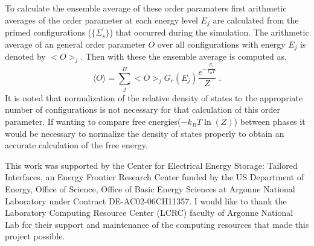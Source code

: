 \documentclass[aps,prl,reprint,superscriptaddress,showkeys]{revtex4-1}
\begin{document}
To calculate the ensemble average of these order paramaters first arithmetic averages of the order parameter at each energy level $E_j$ are calculated from the primed configurations ($\{\Sigma_s ^{'}\}$) that occurred during the simulation. The arithmetic average of an general order parameter $O$ over all configurations with energy $E_j$ is denoted by $< O >_j$. Then with these the ensemble average is computed as, 
  \begin{equation}
  \langle O \rangle  =  \sum_j^{\Pi}< O >_j G_r(E_j) \frac{e^{-\frac{E_j}{k_BT}}}{Z} \;.
  \end{equation}
It is noted that normalization of the relative density of states to the appropriate number of configurations is not necessary for that calculation of this order parameter. If wanting to compare free energies($-k_BT\ln(Z)$) between phases it would be necessary to normalize the density of states properly to obtain an accurate calculation of the free energy. 

\begin{acknowledgments}
This work was supported by the Center for Electrical Energy Storage: Tailored Interfaces, an Energy Frontier Research Center funded 
by the US Department of Energy, Office of Science, Office of Basic Energy Sciences at Argonne National Laboratory under Contract DE-AC02-06CH11357.
I would like to thank the Laboratory Computing Resource Center (LCRC) faculty of Argonne National Lab for their support and maintenance of the computing resources that made this project possible. 
\end{acknowledgments}


\end{document}

